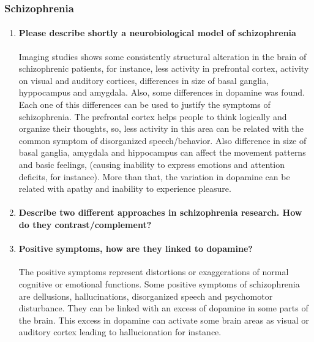 \documentclass[12pt,article,oneside,a4paper]{memoir}
\begin{document}
\subsubsection{Schizophrenia}
\begin{enumerate}
\item \paragraph{Please describe shortly a neurobiological model of
schizophrenia}\label{question:neurobiology-schizophrenia}
Imaging studies shows some consistently structural alteration in the brain of
schizophrenic patients, for instance, less activity in prefrontal cortex,
activity on visual and auditory cortices, differences in size of basal ganglia,
hyppocampus and amygdala. Also, some differences in dopamine was found.
Each one of this differences can be used to justify the symptoms of
schizophrenia.
The prefrontal cortex helps people to think logically and organize their
thoughts, so, less activity in this area can be related with the common symptom
of disorganized speech/behavior. Also difference in size of basal ganglia,
amygdala and hippocampus can affect the movement patterns and basic feelings,
(causing inability to express emotions and attention deficits, for instance).
More than that, the variation in dopamine can be related with apathy and
inability to experience pleasure.

\item \paragraph{Describe two different approaches in schizophrenia research.
How do they contrast/complement?}

\item \paragraph{Positive symptoms, how are they linked to dopamine?}
The positive symptoms represent distortions or exaggerations of normal
cognitive or emotional functions. Some positive symptoms of schizophrenia are
dellusions, hallucinations, disorganized speech and psychomotor disturbance.
They can be linked with an excess of dopamine in some parts of the brain. This
excess in dopamine can activate some brain areas as visual or auditory cortex
leading to hallucionation for instance.


\end{enumerate}
\end{document}
